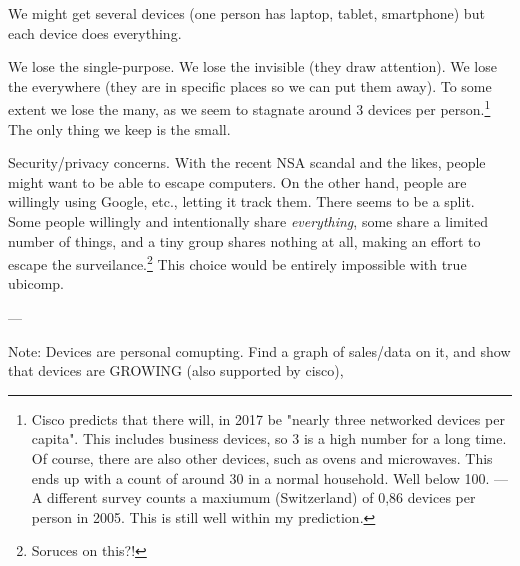 We might get several devices (one person has laptop, tablet, smartphone) but each device does everything.

We lose the single-purpose. We lose the invisible (they draw attention). We lose the everywhere (they are in specific places
so we can put them away). To some extent we lose the many, as we seem to stagnate around 3 devices per person.\footnote{Cisco
predicts that there will, in 2017 be "nearly three networked devices per capita". This includes business devices, so 3 is a
high number for a long time.\cite{cisco} Of course, there are also other devices, such as ovens and microwaves. This ends up
with a count of around 30 in a normal household. Well below 100. --- A different survey counts a maxiumum (Switzerland) of
0,86 devices per person in 2005. This is still well within my prediction.\cite{nationmaster}} The only thing we keep is the small.

Security/privacy concerns. With the recent NSA scandal and the likes, people might want to be able to escape computers.
On the other hand, people are willingly using Google, etc., letting it track them. There seems to be a split. Some people
willingly and intentionally share \emph{everything}, some share a limited number of things, and a tiny group shares nothing
at all, making an effort to escape the surveilance.\footnote{Soruces on this?!} This choice would be entirely impossible
with true ubicomp.

---

Note: Devices are personal comupting. Find a graph of sales/data on it, and show that devices are GROWING (also supported by cisco),